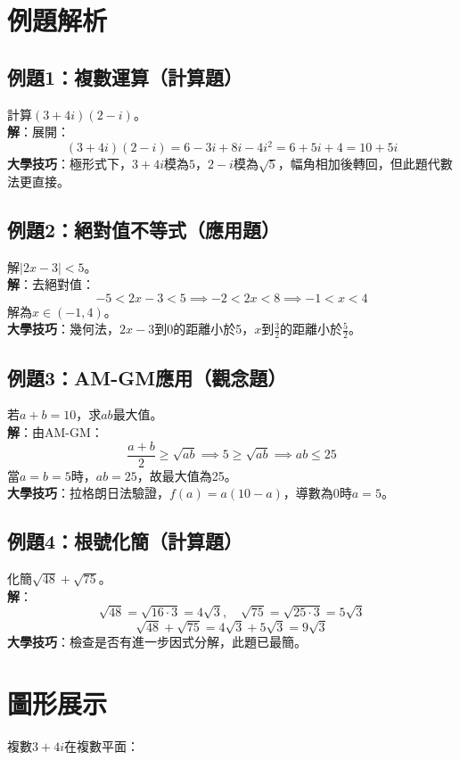 \section{例題解析}

\subsection{例題1：複數運算（計算題）}
計算$(3 + 4i)(2 - i)$。\\
\textbf{解}：展開：
\[
(3 + 4i)(2 - i) = 6 - 3i + 8i - 4i^2 = 6 + 5i + 4 = 10 + 5i
\]
\textbf{大學技巧}：極形式下，$3 + 4i$模為$5$，$2 - i$模為$\sqrt{5}$，幅角相加後轉回，但此題代數法更直接。

\subsection{例題2：絕對值不等式（應用題）}
解$|2x - 3| < 5$。\\
\textbf{解}：去絕對值：
\[
-5 < 2x - 3 < 5 \implies -2 < 2x < 8 \implies -1 < x < 4
\]
解為$x \in (-1, 4)$。\\
\textbf{大學技巧}：幾何法，$2x - 3$到0的距離小於5，$x$到$\frac{3}{2}$的距離小於$\frac{5}{2}$。

\subsection{例題3：AM-GM應用（觀念題）}
若$a + b = 10$，求$ab$最大值。\\
\textbf{解}：由AM-GM：
\[
\frac{a + b}{2} \geq \sqrt{ab} \implies 5 \geq \sqrt{ab} \implies ab \leq 25
\]
當$a = b = 5$時，$ab = 25$，故最大值為25。\\
\textbf{大學技巧}：拉格朗日法驗證，$f(a) = a(10 - a)$，導數為0時$a = 5$。

\subsection{例題4：根號化簡（計算題）}
化簡$\sqrt{48} + \sqrt{75}$。\\
\textbf{解}：
\[
\sqrt{48} = \sqrt{16 \cdot 3} = 4\sqrt{3}, \quad \sqrt{75} = \sqrt{25 \cdot 3} = 5\sqrt{3}
\]
\[
\sqrt{48} + \sqrt{75} = 4\sqrt{3} + 5\sqrt{3} = 9\sqrt{3}
\]
\textbf{大學技巧}：檢查是否有進一步因式分解，此題已最簡。

\section{圖形展示}
複數$3 + 4i$在複數平面：

